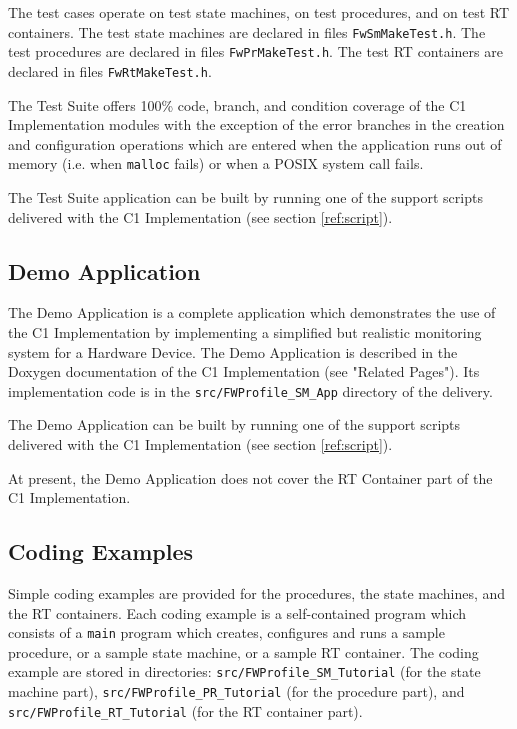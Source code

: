 \documentclass[a4paper,10pt]{article}
\begin{document}
The test cases operate on test state machines, on test procedures, and on test RT containers. 
The test state machines are declared in files \texttt{FwSmMakeTest.h}. 
The test procedures are declared in files \texttt{FwPrMakeTest.h}.
The test RT containers are declared in files \texttt{FwRtMakeTest.h}.

The Test Suite offers 100\% code, branch, and condition coverage of the C1 Implementation modules with the exception of the error branches in the creation and configuration operations which are entered when the application runs out of memory (i.e. when \texttt{malloc} fails) or when a POSIX system call fails.

The Test Suite application can be built by running one of the support scripts delivered with the C1 Implementation (see section \ref{ref:script}). 

\subsection{Demo Application}\label{sec:demoApp}
The Demo Application is a complete application which demonstrates the use of the C1 Implementation by implementing a simplified but realistic monitoring system for a Hardware Device. The Demo Application is described in the Doxygen documentation of the C1 Implementation (see "Related Pages"). Its implementation code is in the \texttt{src/FWProfile\_SM\_App} directory of the delivery.

The Demo Application can be built by running one of the support scripts delivered with the C1 Implementation (see section \ref{ref:script}). 

At present, the Demo Application does not cover the RT Container part of the C1 Implementation.

\subsection{Coding Examples}\label{sec:codingExamples}
Simple coding examples are provided for the procedures, the state machines, and the RT containers. Each coding example is a self-contained program which consists of a \texttt{main} program which creates, configures and runs a sample procedure, or a sample state machine, or a sample RT container. The coding example are stored in directories: \texttt{src/FWProfile\_SM\_Tutorial} (for the state machine part), \texttt{src/FWProfile\_PR\_Tutorial} (for the procedure part), and \texttt{src/FWProfile\_RT\_Tutorial} (for the RT container part).
\end{document}
